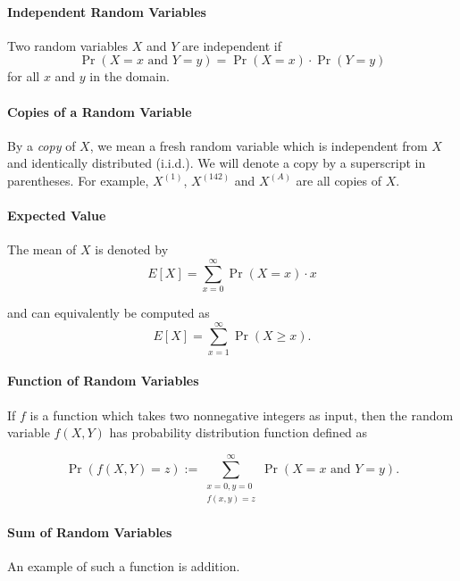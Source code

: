 \documentclass{masterthesis}
\begin{document}
\paragraph*{Independent Random Variables}\label{paragraph:independent_random_variables}
Two random variables $X$ and $Y$ are independent if 
\begin{equation}
    \Pr(X = x \text{ and } Y = y) = \Pr(X = x) \cdot \Pr(Y = y)
\end{equation}
for all $x$ and $y$ in the domain.

\paragraph{Copies of a Random Variable}\label{paragraph:copies_of_a_random_variable} By a \textit{copy} of $X$, we mean a fresh random variable which is independent from $X$ and identically distributed (i.i.d.).
We will denote a copy by a superscript in parentheses. For example, $X^{(1)}$, $X^{(142)}$ and $X^{(A)}$ are all copies of $X$.

\paragraph*{Expected Value}
The mean of $X$ is denoted by 
\begin{equation}\label{eq:expectation}
    E[X] = \sum_{x=0}^{\infty} \Pr(X = x) \cdot x
\end{equation}

and can equivalently be computed as 
\begin{equation}
    E[X] = \sum_{x=1}^{\infty} \Pr(X \geq x).
\end{equation}

\paragraph*{Function of Random Variables}\label{paragraph:function_of_random_variables}
If $f$ is a function which takes two nonnegative integers as input, then the random variable $f(X, Y)$ has probability distribution function defined as

\begin{equation}
    \Pr(f(X, Y) = z) := \sum_{\substack{x=0, y=0 \\ f(x,y)=z}}^{\infty} \Pr(X = x \text{ and } Y = y).
\end{equation}

\paragraph*{Sum of Random Variables}\label{paragraph:sum_of_random_variables}
An example of such a function is addition. 
\end{document}
